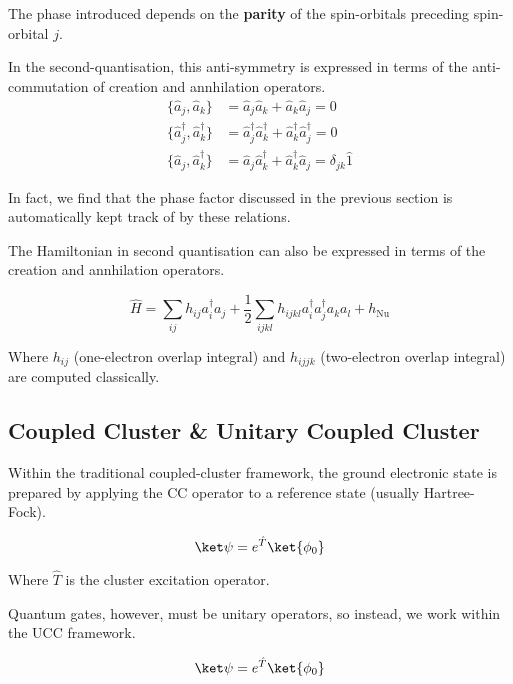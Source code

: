 The phase introduced depends on the \textbf{parity} of the spin-orbitals preceding spin-orbital $j$.

In the second-quantisation, this anti-symmetry is expressed in terms of the anti-commutation of creation and annhilation operators.
\begin{align*}
    \{ \hat a_{j}, \hat a_{k} \} &=
    \hat a_{j} \hat a_{k} + \hat a_{k} \hat a_{j} = 0 \\
    \{ \hat a_{j}^{\dagger}, \hat a_{k}^{\dagger} \} &=
    \hat a_{j}^\dagger \hat a_{k}^\dagger + \hat a_{k}^\dagger \hat a_{j}^\dagger = 0 \\
    \{ \hat a_{j}, \hat a_{k}^{\dagger} \} &= \hat a_{j} \hat a_{k}^\dagger + \hat a_{k}^\dagger \hat a_{j} = \delta_{jk} \hat{1}
\end{align*}

In fact, we find that the phase factor discussed in the previous section is automatically kept track of by these relations.

The Hamiltonian in second quantisation can also be expressed in terms of the creation and annhilation operators.

\begin{equation*}
    \hat H =
    \sum_{ij} h_{ij} a^\dagger_i a_j +
    \frac{1}{2} \sum_{ijkl} h_{ijkl} a^\dagger_i a^\dagger_j a_k a_l +
    h_\text{Nu}
\end{equation*}

Where $h_{ij}$ (one-electron overlap integral) and $h_{ijjk}$ (two-electron overlap integral) are computed classically.


\subsection{Coupled Cluster \& Unitary Coupled Cluster}

Within the traditional coupled-cluster framework, the ground electronic state is prepared by applying the CC operator to a reference state (usually Hartree-Fock).

\begin{equation*}
    \ket\psi = e^{\hat T} \ket{\phi_0}
\end{equation*}

Where $\hat T$ is the cluster excitation operator.

Quantum gates, however, must be unitary operators, so instead, we work within the UCC framework.

\begin{equation*}
    \ket\psi = e^{\hat T} \ket{\phi_0}
\end{equation*}

